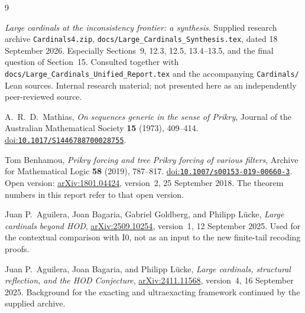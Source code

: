 \documentclass[11pt,letterpaper]{article}
\theoremstyle{definition}
\numberwithin{equation}{section}
\newcommand{\Izero}{\mathrm{I0}}
\newcommand{\arxiv}[1]{\href{https://arxiv.org/abs/#1}{arXiv:#1}}
\newcommand{\doi}[1]{\href{https://doi.org/#1}{doi:\nolinkurl{#1}}}
\begin{document}
\begin{thebibliography}{9}

\emph{Large cardinals at the inconsistency frontier: a synthesis}.
Supplied research archive \nolinkurl{Cardinals4.zip},
\nolinkurl{docs/Large_Cardinals_Synthesis.tex}, dated 18 September 2026.
Especially Sections~9, 12.3, 12.5, 13.4--13.5, and the final question of
Section~15. Consulted together with
\nolinkurl{docs/Large_Cardinals_Unified_Report.tex} and the accompanying
\nolinkurl{Cardinals/} Lean sources. Internal research material; not
presented here as an independently peer-reviewed source.

A.~R.~D.~Mathias,
\emph{On sequences generic in the sense of Prikry},
Journal of the Australian Mathematical Society \textbf{15} (1973), 409--414.
\doi{10.1017/S1446788700028755}.

Tom Benhamou,
\emph{Prikry forcing and tree Prikry forcing of various filters},
Archive for Mathematical Logic \textbf{58} (2019), 787--817.
\doi{10.1007/s00153-019-00660-3}.
Open version: \arxiv{1801.04424}, version~2, 25 September 2018.
The theorem numbers in this report refer to that open version.

Juan P.~Aguilera, Joan Bagaria, Gabriel Goldberg, and Philipp L\"ucke,
\emph{Large cardinals beyond HOD},
\arxiv{2509.10254}, version~1, 12 September 2025.
Used for the contextual comparison with $\Izero$, not as an input to the
new finite-tail recoding proofs.

Juan P.~Aguilera, Joan Bagaria, and Philipp L\"ucke,
\emph{Large cardinals, structural reflection, and the HOD Conjecture},
\arxiv{2411.11568}, version~4, 16 September 2025.
Background for the exacting and ultraexacting framework continued by
the supplied archive.

\end{thebibliography}
\end{document}

